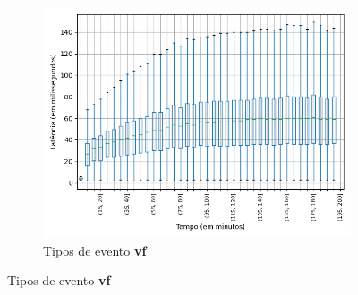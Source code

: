 \begin{figure}[p]
\centering
\begin{subfigure}{.5\textwidth}
\centering
\includegraphics[width=\textwidth]{figuras/graphics/boxplot_7-dez-is_vf.png}
\caption{Tipos de evento \textbf{vf}}
\label{fig:BoxPlot_vf_7-dez-is-r}
\end{subfigure}%


\end{figure}
